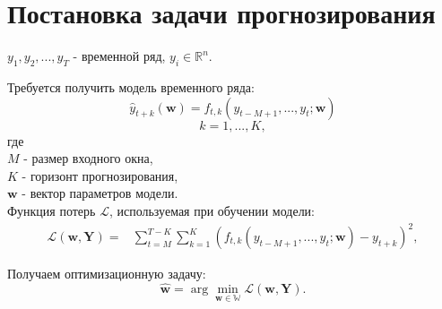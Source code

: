 \newpage

\section{Постановка задачи прогнозирования}

$y_{1}, y_{2}, ..., y_{T} $ - временной ряд, $y_{i} \in \mathbb{R}^{n}$.

\bigskip

Требуется получить модель временного ряда:
$$\hat{y}_{t+k}(\mathbf{w}) = f_{t,k}(y_{t-M+1}, ..., y_{t}; \mathbf{w})$$
$$k = 1, ..., K,$$
где  \\
$M$ - размер входного окна, \\
$K$ - горизонт прогнозирования, \\
$\mathbf{w}$ - вектор параметров модели. \\

Функция потерь $\mathcal{L}$, используемая при обучении модели:
\[
\begin{aligned}
    \mathcal{L}(\mathbf{w, Y}) =& \sum\limits_{t=M}^{T-K}\sum\limits_{k=1}^{K}(f_{t,k}(y_{t-M+1}, ..., y_{t}; \mathbf{w})-y_{t+k})^{2},
\end{aligned}
\]

Получаем оптимизационную задачу:
$$\hat{\mathbf{w}} = \arg\min_{\mathbf{w} \in \mathbb{W}} \mathcal{L}(\mathbf{w, Y}).$$